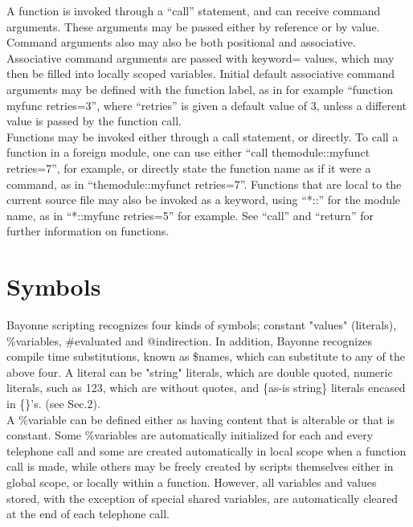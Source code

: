 \documentclass[a4paper,12pt]{article}
\begin{document}
A function is invoked through a ``call'' statement, and can receive
command arguments.  These arguments may be passed either by reference or
by value.  Command arguments also may also be both positional and
associative.  Associative command arguments are passed with keyword= 
values, which may then be filled into locally scoped variables.  Initial 
default associative command arguments may be defined with the function 
label, as in for example ``function myfunc retries=3'', where 
``retries'' is given a default value of 3, unless a different value is 
passed by the function call. \\

Functions may be invoked either through a call statement, or directly.  
To call a function in a foreign module, one can use either ``call 
themodule::myfunct retries=7'', for example, or directly state the 
function name as if it were a command, as in ``themodule::myfunct 
retries=7''.  Functions that are local to the current source file may 
also be invoked as a keyword, using ``*::'' for the module name, as in 
``*::myfunc retries=5'' for example.  See ``call'' and ``return'' for 
further information on functions. \\

\section{Symbols}

Bayonne scripting recognizes four kinds of symbols; constant "values"  
(literals), \%variables, \#evaluated and @indirection.  In addition, Bayonne
recognizes compile time substitutions, known as \$names, which can
substitute to any of the above four.  A literal can be "string" literals,
which are double quoted, numeric literals, such as 123, which are without
quotes, and \{as-is string\} literals encased in \{\}'s.  (see Sec.2). \\

A \%variable can be defined either as having content that is alterable
or that is constant.  Some \%variables are automatically initialized for
each and every telephone call and some are created automatically in
local scope when a function call is made, while others may be freely
created by scripts themselves either in global scope, or locally within
a function.  However, all variables and values stored, with the
exception of special shared variables, are automatically cleared at the
end of each telephone call. \\
\end{document}
